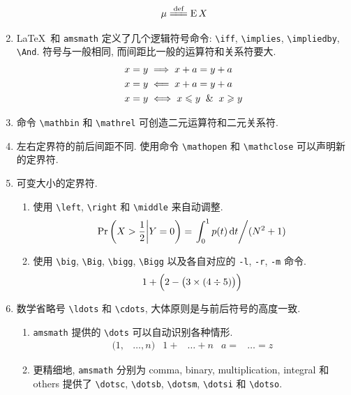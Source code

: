 \documentclass[UTF8,no-math]{ctexart}
\numberwithin{enumi}{section}
\begin{document}
\begin{enumerate}
        \begin{equation}
        \mu\xlongequal{\text{def}}\expect X
        \end{equation}
        \item \LaTeX\ 和 \texttt{amsmath} 定义了几个逻辑符号命令: \verb|\iff|, \verb|\implies|, \verb|\impliedby|, \verb|\And|. 符号与一般相同, 而间距比一般的运算符和关系符要大.
        \begin{align}
        x=y &\implies x+a=y+a \notag\\
        x=y &\impliedby x+a=y+a \notag\\
        x=y &\iff x\leqslant y \And x\geqslant y 
        \end{align}
        \item 命令 \verb|\mathbin| 和 \verb|\mathrel| 可创造二元运算符和二元关系符.
        \item 左右定界符的前后间距不同. 使用命令 \verb|\mathopen| 和 \verb|\mathclose| 可以声明新的定界符. 
        \item 可变大小的定界符.
        \begin{enumerate}
            \item 使用 \verb|\left|, \verb|\right| 和 \verb|\middle| 来自动调整.
            \begin{equation}
            \Pr\left(X>\frac12\middle\vert Y=0\right)=\left.\int_0^1 p(t)\operatorname{d\!}{t}\middle/ (N^2+1)\right.
            \end{equation}
            \item 使用 \verb|\big|, \verb|\Big|, \verb|\bigg|, \verb|\Bigg| 以及各自对应的 \verb|-l|, \verb|-r|, \verb|-m| 命令.
            \begin{equation}
            1+\Bigl( 2-\bigl( 3\times(4\div5) \bigr) \Bigr)
            \end{equation}
        \end{enumerate}
        \item 数学省略号 \verb|\ldots| 和 \verb|\cdots|, 大体原则是与前后符号的高度一致. 
        \begin{enumerate}
            \item \texttt{amsmath} 提供的 \verb|\dots| 可以自动识别各种情形.
            \begin{align}
            (1,&\dots,n) & 1+&\dots+n & a=&\dots=z
            \end{align}
            \item 更精细地, \texttt{amsmath} 分别为 comma, binary, multiplication, integral 和 others 提供了 \verb|\dotsc|, \verb|\dotsb|, \verb|\dotsm|, \verb|\dotsi| 和 \verb|\dotso|.

\end{enumerate}
\end{enumerate}
\end{document}
